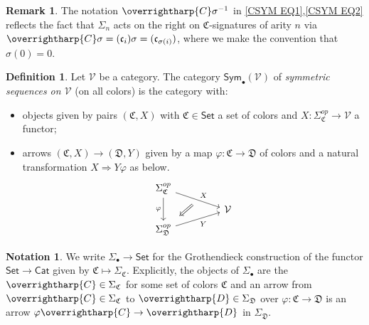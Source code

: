 \documentclass[a4paper,10pt
,draft
]{article}%
\numberwithin{equation}{section}
\numberwithin{figure}{section}
\theoremstyle{definition} %
\newtheorem{definition}[equation]{Definition}%
\newtheorem{remark}[equation]{Remark}%
\newtheorem{notation}[equation]{Notation}%
\newcommand{\vect}[1]{\text{\overrightharp{\ensuremath{#1}}}}
\newcommand{\1}{\ensuremath{\mathbbm 1}}%
\begin{document}
\begin{remark}\label{GLOBSIG REM}
	The notation $\vect{C} \sigma^{-1}$
	in \eqref{CSYM EQ1},\eqref{CSYM EQ2}
	reflects the fact that $\Sigma_n$
	acts on the right on $\mathfrak{C}$-signatures of arity $n$
	via 
	$\vect{C} \sigma = (\mathfrak{c}_i)\sigma = 
	(\mathfrak{c}_{\sigma(i)})$,
	where we make the convention that $\sigma(0)=0$.
\end{remark}



\begin{definition}\label{CSSYM DEF}
	Let $\mathcal{V}$ be a category.
	The category $\mathsf{Sym}_\bullet(\mathcal{V})$ of
	\textit{symmetric sequences on $\mathcal{V}$} 
	(on all colors) is the category with:
	\begin{itemize}
		\item objects given by pairs $(\mathfrak C, X)$ with
		$\mathfrak{C} \in \mathsf{Set}$ a set of colors and
		$X \colon \Sigma_{\mathfrak{C}}^{op} \to \mathcal{V}$ a functor;
		\item arrows $(\mathfrak C, X) \to (\mathfrak D, Y)$ given by a map 
		$\varphi \colon \mathfrak{C} \to \mathfrak{D}$ of colors and a natural transformation $X \Rightarrow Y \varphi$ as below.
	\begin{equation}\label{CSSYM EQ}
		\begin{tikzcd}[row sep = tiny, column sep = 45pt]
		\Sigma_{\mathfrak{C}}^{op} \arrow[dr, "X"{name=U}] 
		\arrow{dd}[swap]{\varphi}
	\\
		& \mathcal{V}
	\\
		|[alias=V]| \Sigma_{\mathfrak{D}}^{op} \arrow[ur, "Y"']
		\arrow[Leftarrow, from=V, to=U,shorten >=0.25cm,shorten <=0.25cm]
		\end{tikzcd}
	\end{equation}
	\end{itemize}
\end{definition}



\begin{notation}\label{SIGMABULL NOT}
	We write
	$\Sigma_{\bullet} \to \mathsf{Set}$
	for the Grothendieck construction 
	\cite[Not. \ref{OC-GROTHCONS NOT}]{BP_FCOP}
	of the functor
	$\mathsf{Set} \to \mathsf{Cat}$ given by
	$\mathfrak{C} \mapsto \Sigma_{\mathfrak{C}}$.
%	
	Explicitly, 
	the objects of $\Sigma_{\bullet}$
	are the $\vect{C} \in \Sigma_{\mathfrak{C}}$ 
	for some set of colors $\mathfrak{C}$
	and an arrow from
	$\vect{C} \in \Sigma_{\mathfrak{C}}$ to
	$\vect{D} \in \Sigma_{\mathfrak{D}}$
	over $\varphi \colon \mathfrak{C} \to \mathfrak{D}$
	is an arrow
	$\varphi \vect{C} \to \vect{D}$ in $\Sigma_{\mathfrak{D}}$.
\end{notation}
\end{document}
